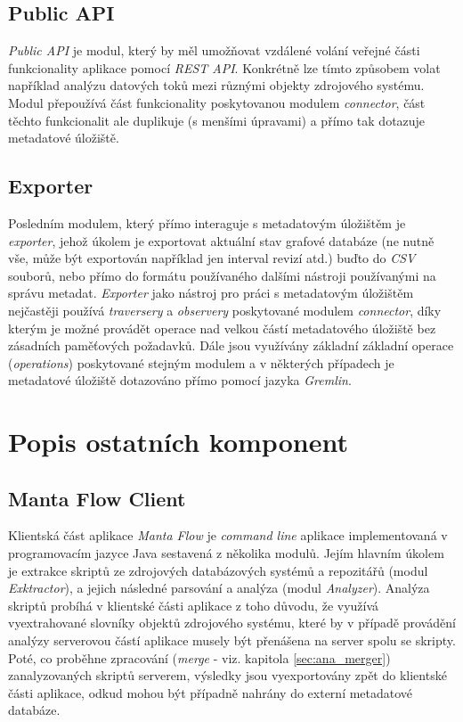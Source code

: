 \subsection{Public API}
\label{sec:ana_public}
\textit{Public API} je modul, který by měl umožňovat vzdálené volání veřejné části funkcionality aplikace pomocí \textit{REST API}. Konkrétně lze tímto způsobem volat například analýzu datových toků mezi různými objekty zdrojového systému. Modul přepoužívá část funkcionality poskytovanou modulem \textit{connector}, část těchto funkcionalit ale duplikuje (s menšími úpravami) a přímo tak dotazuje metadatové úložiště.

\subsection{Exporter}
\label{sec:ana_exporter}
Posledním modulem, který přímo interaguje s metadatovým úložištěm je \textit{exporter}, jehož úkolem je exportovat aktuální stav grafové databáze (ne nutně vše, může být exportován například jen interval revizí atd.) buďto do \textit{CSV} souborů, nebo přímo do formátu používaného dalšími nástroji používanými na správu metadat. \textit{Exporter} jako nástroj pro práci s metadatovým úložištěm nejčastěji používá \textit{traversery} a \textit{observery} poskytované modulem \textit{connector}, díky kterým je možné provádět operace nad velkou částí metadatového úložiště bez zásadních paměťových požadavků. Dále jsou využívány základní základní operace (\textit{operations}) poskytované stejným modulem a v některých případech je metadatové úložiště dotazováno přímo pomocí jazyka \textit{Gremlin}.


\section{Popis ostatních komponent}
\label{sec:ana_other}
\subsection{Manta Flow Client}
\label{sec:ana_cli}
Klientská část aplikace \textit{Manta Flow} je \textit{command line} aplikace implementovaná v programovacím jazyce Java sestavená z několika modulů. Jejím hlavním úkolem je extrakce skriptů ze zdrojových databázových systémů a repozitářů (modul \textit{Exktractor}), a jejich následné parsování a analýza (modul \textit{Analyzer}). Analýza skriptů probíhá v klientské části aplikace z toho důvodu, že využívá vyextrahované slovníky objektů zdrojového systému, které by v případě provádění analýzy serverovou částí aplikace musely být přenášena na server spolu se skripty. Poté, co proběhne zpracování (\textit{merge} - viz. kapitola \ref{sec:ana_merger}) zanalyzovaných skriptů serverem, výsledky jsou vyexportovány zpět do klientské části aplikace, odkud mohou být případně nahrány do externí metadatové databáze.

